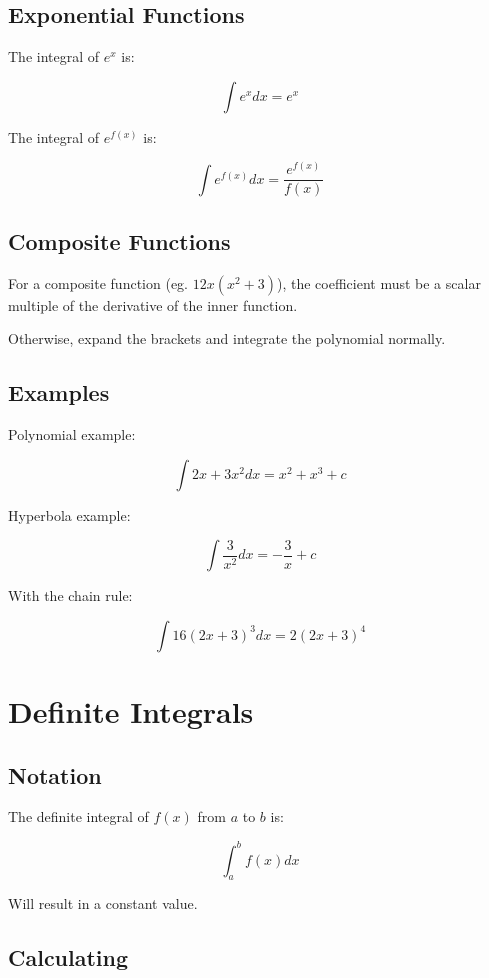 \documentclass[a4paper,11pt]{article}
\begin{document}
\subsection{Exponential Functions}

The integral of $e^x$ is:

$$
\int e^x dx = e^x
$$

The integral of $e^{f(x)}$ is:

$$
\int e^{f(x)} dx = \frac{e^{f(x)}}{f(x)}
$$


\subsection{Composite Functions}

For a composite function (eg. $12x(x^2 + 3)$), the coefficient must be a scalar
multiple of the derivative of the inner function.

Otherwise, expand the brackets and integrate the polynomial normally.


\subsection{Examples}

Polynomial example:

$$
\int 2x + 3x^2 dx = x^2 + x^3 + c
$$

Hyperbola example:

$$
\int \frac{3}{x^2} dx = -\frac{3}{x} + c
$$

With the chain rule:

$$
\int 16(2x + 3)^3 dx = 2(2x + 3)^4
$$




\section{Definite Integrals}

\subsection{Notation}

The definite integral of $f(x)$ from $a$ to $b$ is:

$$
\int_a^b f(x) dx
$$

Will result in a constant value.


\subsection{Calculating}
\end{document}
